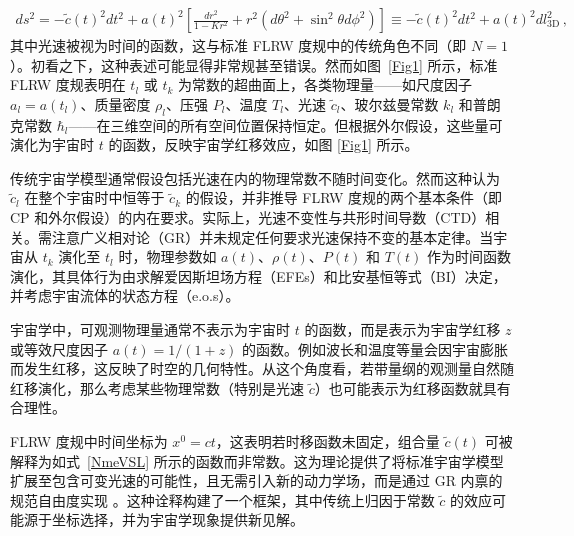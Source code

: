 \documentclass[jkps,preprint,fleqn]{revtex4}
\newcommand{\tc}{\tilde{c}}
\begin{document}
\begin{align}
ds^2 = - \tc(t)^2 dt^2 + a(t)^2 \left[ \frac{dr^2}{1-Kr^2} + r^2  \left( d \theta^2 + \sin^2 \theta d \phi^2 \right)  \right] \equiv - \tc(t)^2 dt^2 + a(t)^2 dl_{3\textrm{D}}^2 \label{dstgen} \,,
\end{align}
其中光速被视为时间的函数，这与标准 FLRW 度规中的传统角色不同（即 $N = 1$）。初看之下，这种表述可能显得非常规甚至错误。然而如图~\ref{Fig1} 所示，标准 FLRW 度规表明在 $t_l$ 或 $t_k$ 为常数的超曲面上，各类物理量——如尺度因子 $a_l = a(t_l)$、质量密度 $\rho_l$、压强 $P_l$、温度 $T_l$、光速 $\tc_l$、玻尔兹曼常数 $k_l$ 和普朗克常数 $\hbar_l$——在三维空间的所有空间位置保持恒定。但根据外尔假设，这些量可演化为宇宙时 $t$ 的函数，反映宇宙学红移效应，如图 \ref{Fig1} 所示。

传统宇宙学模型通常假设包括光速在内的物理常数不随时间变化。然而这种认为 $\tc_l$ 在整个宇宙时中恒等于 $\tc_k$ 的假设，并非推导 FLRW 度规的两个基本条件（即 CP 和外尔假设）的内在要求。实际上，光速不变性与共形时间导数（CTD）相关。需注意广义相对论（GR）并未规定任何要求光速保持不变的基本定律。当宇宙从 $t_k$ 演化至 $t_l$ 时，物理参数如 $a(t)$、$\rho(t)$、$P(t)$ 和 $T(t)$ 作为时间函数演化，其具体行为由求解爱因斯坦场方程（EFEs）和比安基恒等式（BI）决定，并考虑宇宙流体的状态方程（e.o.s）。

宇宙学中，可观测物理量通常不表示为宇宙时 $t$ 的函数，而是表示为宇宙学红移 $z$ 或等效尺度因子 $a(t) = 1/(1+z)$ 的函数。例如波长和温度等量会因宇宙膨胀而发生红移，这反映了时空的几何特性。从这个角度看，若带量纲的观测量自然随红移演化，那么考虑某些物理常数（特别是光速 $\tc$）也可能表示为红移函数就具有合理性。

FLRW 度规中时间坐标为 $x^0 = ct$，这表明若时移函数未固定，组合量 $\tc(t)$ 可被解释为如式~\eqref{NmeVSL} 所示的函数而非常数。这为理论提供了将标准宇宙学模型扩展至包含可变光速的可能性，且无需引入新的动力学场，而是通过 GR 内禀的规范自由度实现 \cite{Lee:2024zcu}。这种诠释构建了一个框架，其中传统上归因于常数 $\tc$ 的效应可能源于坐标选择，并为宇宙学现象提供新见解。
\end{document}
